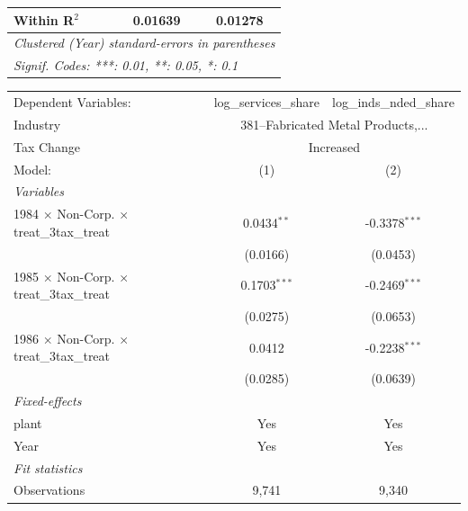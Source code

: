 \documentclass[
  12pt]{article}
\theoremstyle{definition}
\theoremstyle{remark}
\begin{document}
\begin{table}
\begin{minipage}{\linewidth}
\begin{tabular}{lcc}
   Within R$^2$                                            & 0.01639                & 0.01278\\  
   \midrule \midrule
   \multicolumn{3}{l}{\emph{Clustered (Year) standard-errors in parentheses}}\\
   \multicolumn{3}{l}{\emph{Signif. Codes: ***: 0.01, **: 0.05, *: 0.1}}\\
\end{tabular}
\par\endgroup
\begingroup
\centering
\begin{tabular}{lcc}
   \tabularnewline \midrule \midrule
   Dependent Variables:                                    & log\_services\_share   & log\_inds\_nded\_share\\     
   Industry & \multicolumn{2}{c}{381–Fabricated Metal Products,...} \\ 
   Tax Change & \multicolumn{2}{c}{Increased} \\ 
   Model:                                                  & (1)                    & (2)\\  
   \midrule
   \emph{Variables}\\
   1984 $\times$ Non-Corp. $\times$ treat\_3tax\_treat     & 0.0434$^{**}$          & -0.3378$^{***}$\\   
                                                           & (0.0166)               & (0.0453)\\   
   1985 $\times$ Non-Corp. $\times$ treat\_3tax\_treat     & 0.1703$^{***}$         & -0.2469$^{***}$\\   
                                                           & (0.0275)               & (0.0653)\\   
   1986 $\times$ Non-Corp. $\times$ treat\_3tax\_treat     & 0.0412                 & -0.2238$^{***}$\\   
                                                           & (0.0285)               & (0.0639)\\   
   \midrule
   \emph{Fixed-effects}\\
   plant                                                   & Yes                    & Yes\\  
   Year                                                    & Yes                    & Yes\\  
   \midrule
   \emph{Fit statistics}\\
   Observations                                            & 9,741                  & 9,340\\  

\end{tabular}
\end{minipage}
\end{table}
\end{document}
